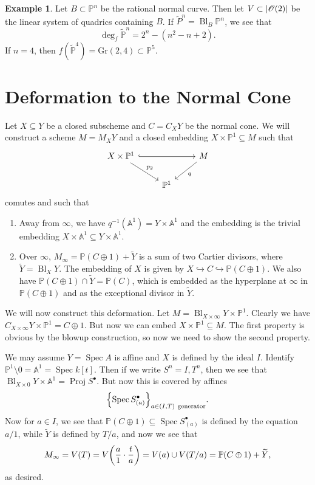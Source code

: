 \documentclass[leqno, openany]{memoir}
\theoremstyle{definition}
\newtheorem{exm}[thm]{Example}
\theoremstyle{remark}
\theoremstyle{plain}
\theoremstyle{definition}
\theoremstyle{remark}
\newcommand{\A}{\mathbb{A}}
\renewcommand{\P}{\mathbb{P}}
\newcommand{\msc}[1]{\mathscr{#1}}
\newcommand{\mr}[1]{\mathrm{#1}}
\newcommand{\wt}[1]{\widetilde{#1}}
\DeclareMathOperator{\Spec}{Spec}
\DeclareMathOperator{\Proj}{Proj}
\DeclareMathOperator{\Bl}{Bl}
\begin{document}
\begin{exm}
    Let $B \subset \P^n$ be the rational normal curve. Then let $V \subset \abs{\msc{O}(2)}$ be the linear system of quadrics containing $B$. If $\wt{P}^n = \Bl_B \P^n$, we see that 
    \[ \deg_f \wt{\P}^n = 2^n - (n^2-n+2). \]
    If $n = 4$, then $f(\wt{\P}^4) = \mr{Gr}(2,4) \subset \P^5$.
\end{exm}

\section{Deformation to the Normal Cone}%
\label{sec:deformation_to_the_normal_cone}

Let $X \subseteq Y$ be a closed subscheme and $C = C_X Y$ be the normal cone. We will construct a scheme $M = M_X Y$ and a closed embedding $X \times \P^1 \subseteq M$ such that
\begin{equation*}
\begin{tikzcd}
    X \times \P^1 \ar[hookrightarrow]{rr} \ar{dr}{p_2} & & M \ar{dl}{q} \\
                                                       & \P^1
\end{tikzcd}
\end{equation*}
comutes and such that
\begin{enumerate}
    \item Away from $\infty$, we have $q^{-1}(\A^1) = Y \times \A^1$ and the embedding is the trivial embedding $X \times \A^1 \subseteq Y \times \A^1$.
    \item Over $\infty$, $M_{\infty} = \P(C \oplus 1) + \wt{Y}$ is a sum of two Cartier divisors, where $\wt{Y} = \Bl_X Y$. The embedding of $X$ is given by $X \hookrightarrow C \hookrightarrow \P(C \oplus 1)$. We also have $\P(C \oplus 1) \cap \wt{Y} = \P(C)$, which is embedded as the hyperplane at $\infty$ in $\P(C \oplus 1)$ and as the exceptional divisor in $\wt{Y}$.
\end{enumerate}

We will now construct this deformation. Let $M = \Bl_{X \times \infty} Y \times \P^1$. Clearly we have $C_{X \times \infty} Y \times \P^1 = C \oplus 1$. But now we can embed $X \times \P^1 \subseteq M$. The first property is obvious by the blowup construction, so now we need to show the second property.

We may assume $Y = \Spec A$ is affine and $X$ is defined by the ideal $I$. Identify $\P^1 \setminus 0 = \A^1 = \Spec k[t]$. Then if we write $S^n = {I,T}^n$, then we see that $\Bl_{X \times 0} Y \times \A^1 = \Proj S^{\bullet}$. But now this is covered by affines 
\[ \qty{\Spec S^{\bullet}_{(a)}}_{a \in (I, T)\ \text{generator}}. \]
Now for $a \in I$, we see that $\P(C \oplus 1) \subseteq \Spec S^{\bullet}_{(a)}$ is defined by the equation $a/1$, while $\wt{Y}$ is defined by $T/a$, and now we see that 
\[ M_{\infty} = V(T) = V\qty(\frac{a}{1} \cdot \frac{t}{a}) = V(a) \cup V(T/a) = \P(C \oplus 1) + \wt{Y}, \]
as desired.
\end{document}
